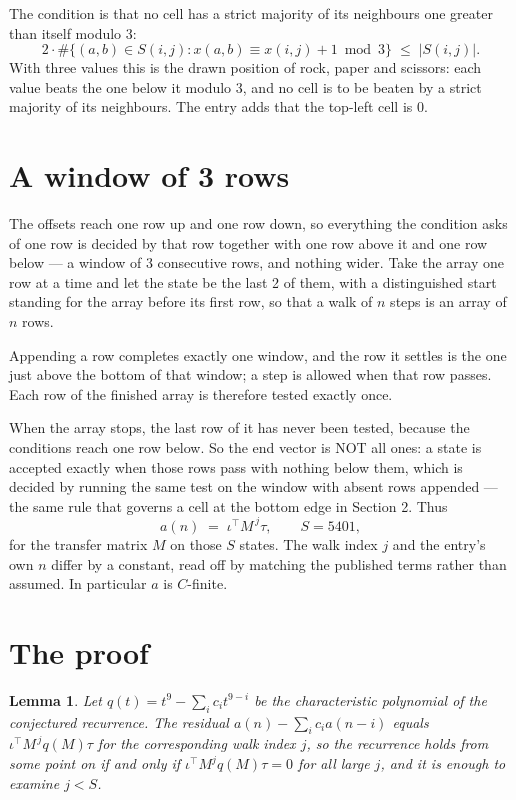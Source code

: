 \documentclass[11pt,a4paper]{article}
\theoremstyle{plain}
\newtheorem{lemma}[theorem]{Lemma}
\theoremstyle{definition}
\begin{document}
The condition is that no cell has a strict majority of its neighbours one greater than itself modulo $3$:
\[
2\cdot\#\{(a,b)\in S(i,j) : x(a,b)\equiv x(i,j)+1 \bmod 3\}\;\le\;|S(i,j)| .
\]
With three values this is the drawn position of rock, paper and scissors: each value beats the one below it modulo $3$, and no cell is to be beaten by a strict majority of its neighbours. The entry adds that the top-left cell is $0$.

\section{A window of 3 rows}

The offsets reach one row up and one row down, so everything the condition asks of one row is
decided by that row together with one row above it and one row below --- a window of
$3$ consecutive rows, and nothing wider. Take the array one row at a time
and let the state be the last 2 of them, with a distinguished start standing for the
array before its first row, so that a walk of $n$ steps is an array of $n$ rows.

Appending a row completes exactly one window, and the row it settles is the one just above the bottom of that window; a step is
allowed when that row passes. Each row of the finished
array is therefore tested exactly once.

When the array stops, the last row of it has never been tested, because the
conditions reach one row below. So the end vector is NOT all ones: a state is accepted exactly when
those rows pass with nothing below them, which is decided by running the same test on the window
with absent rows appended --- the same rule that governs a cell at the bottom edge in
Section 2.
Thus
\[
a(n)\;=\;\iota^{\!\top}M^{\,j}\tau ,\qquad S=5401,
\]
for the transfer matrix $M$ on those $S$ states. The walk index $j$ and the entry's own $n$
differ by a constant, read off by matching the published terms rather than assumed. In
particular $a$ is $C$-finite.

\section{The proof}

\begin{lemma}\label{lem:crit}
Let $q(t)=t^{9}-\sum_i c_it^{9-i}$ be the characteristic polynomial of the
conjectured recurrence. The residual $a(n)-\sum_ic_ia(n-i)$ equals
$\iota^{\!\top}M^{\,j}q(M)\tau$ for the corresponding walk index $j$, so the recurrence
holds from some point on if and only if $\iota^{\!\top}M^{j}q(M)\tau=0$ for all large $j$,
and it is enough to examine $j<S$.
\end{lemma}
\end{document}
